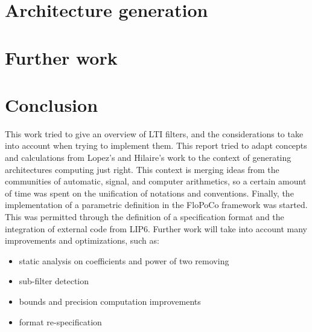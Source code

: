 \documentclass[twoside]{article}
\theoremstyle{remark}
\numberwithin{equation}{subsection}
\newcommand{\TODO}{\textbf{TODO}}
\begin{document}
\newpage
\section{Architecture generation}
\label{Part2}


\newpage
\section{Further work}
\label{Part3}


\newpage
\section*{Conclusion}
	This work tried to give an overview of LTI filters, and the considerations to take into account when trying to implement them.
	This report tried to adapt concepts and calculations from Lopez's and Hilaire's work to the context of generating architectures computing just right.
	This context is merging ideas from the communities of automatic, signal, and computer arithmetics, so a certain amount of time was spent on the unification of notations and conventions.
	Finally, the implementation of a parametric definition in the FloPoCo framework was started.
	This was permitted through the definition of a specification format and the integration of external code from LIP6.
	Further work will take into account many improvements and optimizations, such as:
	\begin{itemize}
		\item static analysis on coefficients and power of two removing
		\item sub-filter detection
		\item bounds and precision computation improvements
		\item format re-specification
	\end{itemize}


\newpage
%
\end{document}
